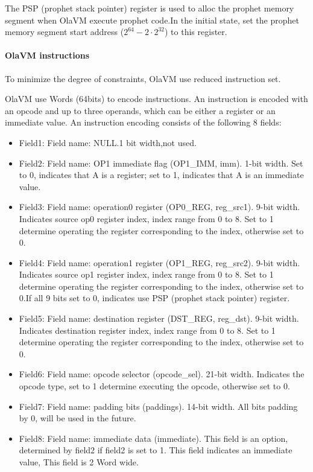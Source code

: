 The PSP (prophet stack pointer) register is used to alloc the prophet memory segment when OlaVM execute prophet code.In the initial state, set the prophet memory segment start address ($2^{64} - 2 \cdot 2^{32}$) to this register.

\paragraph*{OlaVM instructions}

To minimize the degree of constraints, OlaVM use reduced instruction set.

OlaVM use Words (64bits) to encode instructions.
An instruction is encoded with an opcode and up to three operands, which can be either a register or an immediate value.
An instruction encoding consists of the following 8 fields:
\begin{itemize}
    \item Field1: Field name: NULL.1 bit width,not used.
    \item Field2: Field name: OP1 immediate flag (OP1\_IMM, imm). 1-bit width. Set to 0, indicates that A is a register; set to 1, indicates that A is an immediate value.
    \item Field3: Field name: operation0 register (OP0\_REG, reg\_src1). 9-bit width. Indicates source op0 register index, index range from 0 to 8.
                  Set to 1 determine operating the register corresponding to the index, otherwise set to 0.
    \item Field4: Field name: operation1 register (OP1\_REG, reg\_src2). 9-bit width. Indicates source op1 register index, index range from 0 to 8.
                  Set to 1 determine operating the register corresponding to the index, otherwise set to 0.If all 9 bits set to 0, indicates use PSP (prophet stack pointer) register.
    \item Field5: Field name: destination register (DST\_REG, reg\_dst). 9-bit width. Indicates destination register index, index range from 0 to 8.
                  Set to 1 determine operating the register corresponding to the index, otherwise set to 0.
    \item Field6: Field name: opcode selector (opcode\_sel). 21-bit width. Indicates the opcode type, set to 1 determine executing the opcode, otherwise set to 0.
    \item Field7: Field name: padding bits (paddings). 14-bit width.
                  All bits padding by 0, will be used in the future.
    \item Field8: Field name: immediate data (immediate). This field is an option, determined by field2 if field2 is set to 1.
                  This field indicates an immediate value, This field is 2 Word wide.
\end{itemize}

